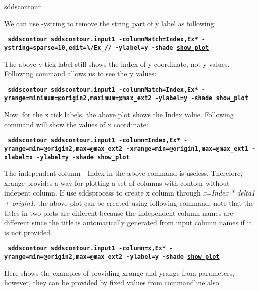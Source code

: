 \begin{sddsprog}{sddscontour}
\begin{itemize}
        We can use -ystring to remove the string part of y label as following:
        \begin{flushleft}{\tt \bf
            sddscontour sddscontour.input1 -columnMatch=Index,Ex* -ystring=sparse=10,edit=\%/Ex\_// -ylabel=y -shade    \href{https://ops.aps.anl.gov/manuals/example_files/sddscontour2_img.html}{show\_plot}
        }\end{flushleft}

        The above y tick label still shows the index of y coordinate, not y values. Following command allows us to see the y values:
        \begin{flushleft}{\tt \bf
            sddscontour sddscontour.input1 -columnMatch=Index,Ex* -yrange=minimum=@origin2,maximum=@max\_ext2 -ylabel=y -shade          \href{https://ops.aps.anl.gov/manuals/example_files/sddscontour3_img.html}{show\_plot}
        }\end{flushleft}

        Now, for the x tick labels, the above plot shows the Index value. Following command will show the values of x coordinate:
    
        \begin{flushleft}{\tt \bf
        sddscontour sddscontour.input1 -column=Index,Ex* -yrange=min=@origin2,max=@max\_ext2 -xrange=min=@origin1,max=@max\_ext1 -xlabel=x -ylabel=y  -shade   \href{https://ops.aps.anl.gov/manuals/example_files/sddscontour4_img.html}{show\_plot}
        }\end{flushleft}  
        
        The independent column - Index in the above command is useless. Therefore, -xrange provides a way for plotting a set of columns with contour without indepent column. If use sddsprocess to create x column through {\em x=Index * delta1 + origin1}, the above plot can be created using following command, note that the titles in two plots are different because the independent column names are different since the title is automatically generated from input column names if it is not provided.

        \begin{flushleft}{\tt \bf
        sddscontour sddscontour.input1 -column=x,Ex* -yrange=min=@origin2,max=@max\_ext2 -ylabel=y -shade   \href{https://ops.aps.anl.gov/manuals/example_files/sddscontour5_img.html}{show\_plot}
        }\end{flushleft}  


       Here shows the examples of providing xrange and yrange from parameters, however, they can be provided by fixed values from commandline also.


\end{itemize}
\end{sddsprog}
